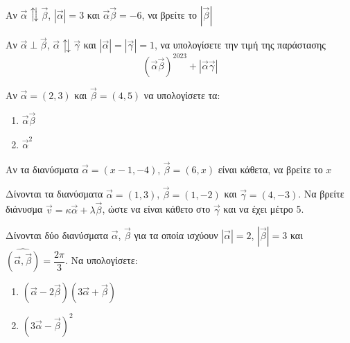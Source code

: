 \documentclass[greek]{beamer}
\begin{document}
\begin{askisi}
  Αν $\vec{α}\updownarrows\vec{β}$, $|\vec{α}|=3$ και $\vec{α}\vec{β}=-6$, να βρείτε το $|\vec{β}|$

\end{askisi}

\begin{askisi}
  Αν $\vec{α}\perp\vec{β}$, $\vec{α}\updownarrows\vec{γ}$ και $|\vec{α}|=|\vec{γ}|=1$, να υπολογίσετε την τιμή της παράστασης
  $$(\vec{α}\vec{β})^{2023}+|\vec{α}\vec{γ}|$$

\end{askisi}

\begin{askisi}
  Αν $\vec{α}=(2,3)$ και $\vec{β}=(4,5)$ να υπολογίσετε τα:
  \begin{enumerate}
    \item<1-> $\vec{α}\vec{β}$
    \item<2-> $\vec{α}^2$
  \end{enumerate}

\end{askisi}

\begin{askisi}
  Αν τα διανύσματα $\vec{α}=(x-1,-4)$, $\vec{β}=(6,x)$ είναι κάθετα, να βρείτε το $x$


\end{askisi}

\begin{askisi}
  Δίνονται τα διανύσματα $\vec{α}=(1,3)$, $\vec{β}=(1,-2)$ και $\vec{γ}=(4,-3)$. Να βρείτε διάνυσμα $\vec{v}=κ\vec{α}+λ\vec{β}$, ώστε να είναι κάθετο στο $\vec{γ}$ και να έχει μέτρο 5.


\end{askisi}

\begin{askisi}
  Δίνονται δύο διανύσματα $\vec{α}$, $\vec{β}$ για τα οποία ισχύουν $|\vec{α}|=2$, $|\vec{β}|=3$ και $\widehat{(\vec{α }, \vec{β })}=\dfrac{2\pi}{3}$. Να υπολογίσετε:
  \begin{enumerate}
    \item<1-> $(\vec{α}-2\vec{β})(3\vec{α}+\vec{β})$
    \item<2-> $(3\vec{α}-\vec{β})^2$
  \end{enumerate}


\end{askisi}
\end{document}
